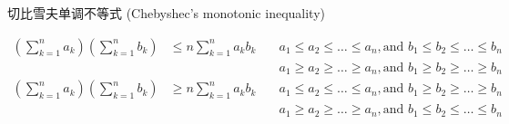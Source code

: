 \documentclass[mode=geye]{elegantnote}
\begin{document}
\begin{theorem}
    切比雪夫单调不等式 (Chebyshec's monotonic inequality)

\begin{equation*}
    \begin{array}{lll}
        \left(\sum_{k=1}^{n} a_k \right) \left(\sum_{k=1}^{n} b_k \right)   &\leqslant n \sum_{k=1}^{n} a_k b_k & \quad a_1\leqslant a_2\leqslant \dots\leqslant a_n, \text{and } b_1\leqslant b_2\leqslant \dots\leqslant b_n \\        
        & & \quad a_1\geqslant a_2\geqslant \dots\geqslant a_n, \text{and } b_1\geqslant b_2\geqslant \dots\geqslant b_n\\
        \left(\sum_{k=1}^{n} a_k \right) \left(\sum_{k=1}^{n} b_k \right)   &\geqslant n \sum_{k=1}^{n} a_k b_k & \quad a_1\leqslant a_2\leqslant \dots\leqslant a_n, \text{and } 
        b_1\geqslant b_2\geqslant \dots\geqslant b_n\\
        & & \quad a_1\geqslant a_2\geqslant \dots\geqslant a_n, \text{and }
        b_1\leqslant b_2\leqslant \dots\leqslant b_n \\        
    \end{array}
\end{equation*}

\end{theorem}
\end{document}
